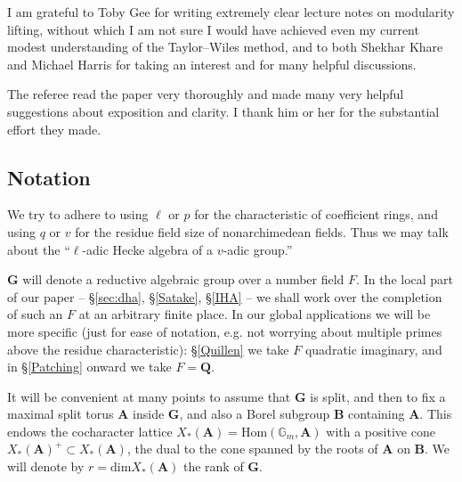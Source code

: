 \documentclass[10pt]{amsart}
\newcommand{\Hom}{\mathrm{Hom}}
\renewcommand{\dim}{\mathrm{dim}}
\newcommand{\Q}{\mathbf{Q}}
\theoremstyle{remark}
\begin{document}
  I am grateful to Toby Gee for writing extremely clear lecture notes on modularity lifting,   without which I am not sure I would have achieved even my current modest understanding
  of  the Taylor--Wiles method, and to both Shekhar Khare and Michael Harris for taking an interest and for many helpful discussions.
     
     The referee read the paper very thoroughly and made many very helpful suggestions about exposition and clarity. I thank him or her for the substantial effort they made. 
      
     \subsection{Notation} \label{sec:notn}
     
We try to adhere to using $\ell$ or $p$ for the characteristic of coefficient rings,
     and using $q$ or $v$ for the  residue field size of nonarchimedean fields. Thus we may talk about the ``$\ell$-adic Hecke algebra of a $v$-adic group.''
     
     $\mathbf{G}$ will denote a   reductive algebraic group over a number field $F$.    
     In the local part of our paper --  \S \ref{sec:dha}, \S \ref{Satake}, \S \ref{IHA}  -- we shall work
     over   the  completion of such an $F$ at an arbitrary finite place. 
     In our global applications we will be more specific (just for ease of notation, e.g. not worrying about multiple primes above the residue characteristic):  \S \ref{Quillen} we take $F$ quadratic imaginary, and in \S \ref{Patching} onward we take $F=\Q$. 
     
     

  
          It will be convenient at many points to assume that $\mathbf{G}$ is split, and then to fix  a maximal split torus $\mathbf{A}$ inside $\mathbf{G}$, and
     also a Borel subgroup $\mathbf{B}$ containing $\mathbf{A}$.   This endows the cocharacter lattice $X_*(\mathbf{A}) = \Hom(\mathbb{G}_m, \mathbf{A})$ 
     with a positive cone  $X_*(\mathbf{A})^+ \subset X_*(\mathbf{A})$, the dual to the cone spanned by the roots of $\mathbf{A}$ on $\mathbf{B}$.
     We will denote by $r = \dim X_*(\mathbf{A})$ the rank of $\mathbf{G}$. 
      
\end{document}
